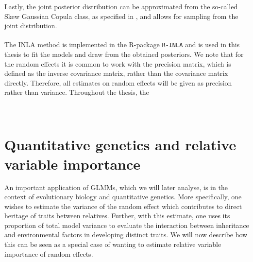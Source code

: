 Lastly, the joint posterior distribution can be approximated from the so-called Skew Gaussian Copula class, as specified in \citet{rue2021joint}, and allows for sampling from the joint distribution.
\\
\\
The INLA method is implemented in the R-package \texttt{R-INLA} \citep{gomezrubio2020inla} and is used in this thesis to fit the models and draw from the obtained posteriors. We note that for the random effects it is common to work with the precision matrix, which is defined as the inverse covariance matrix, rather than the covariance matrix directly. Therefore, all estimates on random effects will be given as precision rather than variance. Throughout the thesis, the 
\\ 
\\ 

\section{Quantitative genetics and relative variable importance}
\label{sec:animalmodel}
An important application of GLMMs, which we will later analyse, is in the context of evolutionary biology and quantitative genetics. More specifically, one wishes to estimate the variance of the random effect which contributes to direct heritage of traits between relatives. Further, with this estimate, one uses its proportion of total model variance to evaluate the interaction between inheritance and environmental factors in developing distinct traits.
We will now describe how this can be seen as a special case of wanting to estimate relative variable importance of random effects.
